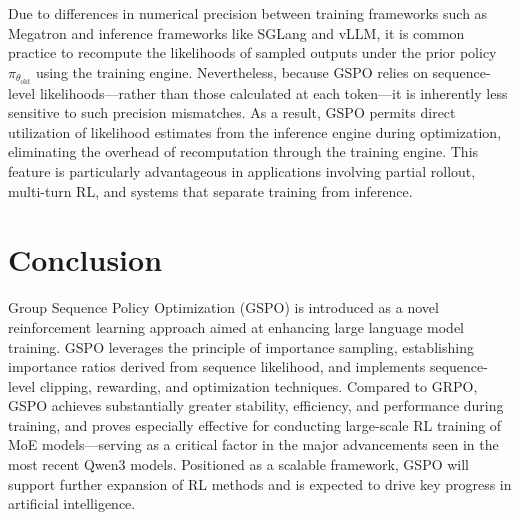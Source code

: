 Due to differences in numerical precision between training frameworks such as Megatron and inference frameworks like SGLang and vLLM, it is common practice to recompute the likelihoods of sampled outputs under the prior policy $\pi_{\theta_\text{old}}$ using the training engine. Nevertheless, because GSPO relies on sequence-level likelihoods—rather than those calculated at each token—it is inherently less sensitive to such precision mismatches. As a result, GSPO permits direct utilization of likelihood estimates from the inference engine during optimization, eliminating the overhead of recomputation through the training engine. This feature is particularly advantageous in applications involving partial rollout, multi-turn RL, and systems that separate training from inference.

\section{Conclusion}

Group Sequence Policy Optimization (GSPO) is introduced as a novel reinforcement learning approach aimed at enhancing large language model training. GSPO leverages the principle of importance sampling, establishing importance ratios derived from sequence likelihood, and implements sequence-level clipping, rewarding, and optimization techniques. Compared to GRPO, GSPO achieves substantially greater stability, efficiency, and performance during training, and proves especially effective for conducting large-scale RL training of MoE models—serving as a critical factor in the major advancements seen in the most recent Qwen3 models. Positioned as a scalable framework, GSPO will support further expansion of RL methods and is expected to drive key progress in artificial intelligence.

